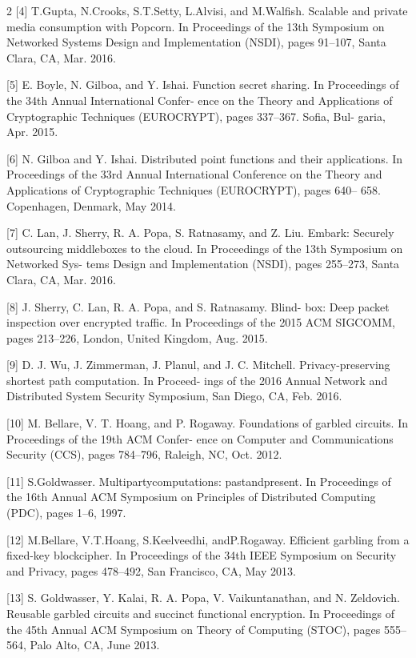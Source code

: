 \documentclass[12pt,a4paper]{article}
\begin{document}
\begin{multicols}{2}
[4] T.Gupta, N.Crooks, S.T.Setty, L.Alvisi, and  M.Walfish. Scalable and private media consumption with Popcorn. In Proceedings of the 13th Symposium on Networked Systems Design and Implementation (NSDI), pages 91–107, Santa Clara, CA, Mar. 2016.

[5] E. Boyle, N. Gilboa, and Y. Ishai. Function secret sharing. In Proceedings of the 34th Annual International Confer- ence on the Theory and Applications of Cryptographic Techniques (EUROCRYPT), pages 337–367. Sofia, Bul- garia, Apr. 2015.

[6] N. Gilboa and Y. Ishai. Distributed point functions and their applications. In Proceedings of the 33rd Annual International Conference on the Theory and Applications of Cryptographic Techniques (EUROCRYPT), pages 640– 658. Copenhagen, Denmark, May 2014.

[7] C. Lan, J. Sherry, R. A. Popa, S. Ratnasamy, and Z. Liu. Embark: Securely outsourcing middleboxes to the cloud. In Proceedings of the 13th Symposium on Networked Sys- tems Design and Implementation (NSDI), pages 255–273, Santa Clara, CA, Mar. 2016.

[8] J. Sherry, C. Lan, R. A. Popa, and S. Ratnasamy. Blind- box: Deep packet inspection over encrypted traffic. In Proceedings of the 2015 ACM SIGCOMM, pages 213–226, London, United Kingdom, Aug. 2015.

[9] D. J. Wu, J. Zimmerman, J. Planul, and J. C. Mitchell. Privacy-preserving shortest path computation. In Proceed- ings of the 2016 Annual Network and Distributed System Security Symposium, San Diego, CA, Feb. 2016.

[10] M. Bellare, V. T. Hoang, and P. Rogaway. Foundations of garbled circuits. In Proceedings of the 19th ACM Confer- ence on Computer and Communications Security (CCS), pages 784–796, Raleigh, NC, Oct. 2012.

[11] S.Goldwasser. Multipartycomputations: pastandpresent. In Proceedings of the 16th Annual ACM Symposium on Principles of Distributed Computing (PDC), pages 1–6, 1997.

[12] M.Bellare, V.T.Hoang, S.Keelveedhi, andP.Rogaway. Efficient garbling from a fixed-key blockcipher. In Proceedings of the 34th IEEE Symposium on Security and Privacy, pages 478–492, San Francisco, CA, May 2013.

[13] S. Goldwasser, Y. Kalai, R. A. Popa, V. Vaikuntanathan, and N. Zeldovich. Reusable garbled circuits and succinct functional encryption. In Proceedings of the 45th Annual ACM Symposium on Theory of Computing (STOC), pages 555–564, Palo Alto, CA, June 2013.


\end{multicols}
\end{document}
